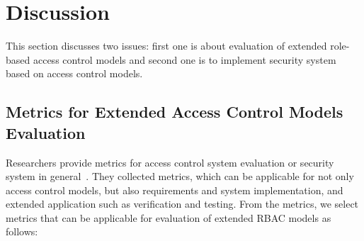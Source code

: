 \section{Discussion} \label{sec:discussion}

This section discusses two issues: first one is about evaluation of extended role-based access control models and second one is to implement security system based on access control models.

\subsection{Metrics for Extended Access Control Models Evaluation }

Researchers provide metrics for access control system evaluation or security system in general~\cite{hu2012:NIST7874}. They collected metrics, which can be applicable for not only access control models, but also requirements and system implementation, and extended application such as verification and testing. From the metrics, we select metrics that can be applicable for evaluation of extended RBAC models as follows:

